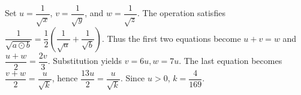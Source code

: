 Set $u=\dfrac{1}{\sqrt x}$, $v=\dfrac{1}{\sqrt y}$, and $w=\dfrac{1}{\sqrt z}$. The operation satisfies $\dfrac{1}{\sqrt{a\odot b}}=\dfrac{1}{2}(\dfrac{1}{\sqrt a}+\dfrac{1}{\sqrt b})$. Thus the first two equations become $u+v=w$ and $\dfrac{u+w}{2}=\dfrac{2v}{3}$. Substitution yields $v=6u,w=7u$. The last equation becomes $\dfrac{v+w}{2}=\dfrac{u}{\sqrt k}$, hence $\dfrac{13u}{2}=\dfrac{u}{\sqrt k}$. Since $u>0$, $\boxed{k=\dfrac{4}{169}}$.
